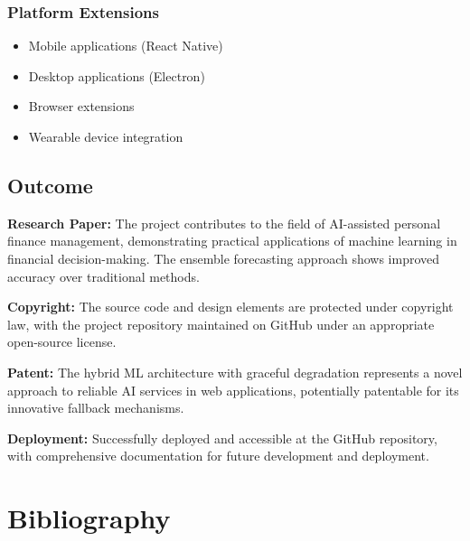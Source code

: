 \documentclass[12pt,a4paper]{article}
\begin{document}
\subsubsection{Platform Extensions}
\begin{itemize}
    \item Mobile applications (React Native)
    \item Desktop applications (Electron)
    \item Browser extensions
    \item Wearable device integration
\end{itemize}

\subsection{Outcome}

\textbf{Research Paper:} The project contributes to the field of AI-assisted personal finance management, demonstrating practical applications of machine learning in financial decision-making. The ensemble forecasting approach shows improved accuracy over traditional methods.

\textbf{Copyright:} The source code and design elements are protected under copyright law, with the project repository maintained on GitHub under an appropriate open-source license.

\textbf{Patent:} The hybrid ML architecture with graceful degradation represents a novel approach to reliable AI services in web applications, potentially patentable for its innovative fallback mechanisms.

\textbf{Deployment:} Successfully deployed and accessible at the GitHub repository, with comprehensive documentation for future development and deployment.

\section{Bibliography}
\end{document}
